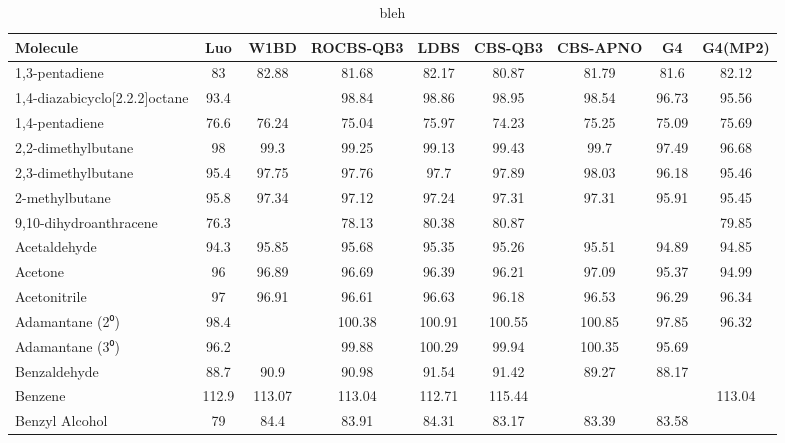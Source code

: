 \begin{center}
\begin{longtable}{l | c c c c c c c c}
\caption{bleh} \label{tab:bde-calc} \\
 Molecule                       &   Luo &   W1BD & ROCBS-QB3 &   LDBS & CBS-QB3 & CBS-APNO &     G4 & G4(MP2) \\
\hline
 1,3-pentadiene                 &    83 &  82.88 &     81.68 &  82.17 &   80.87 &    81.79 &   81.6 &   82.12 \\
 1,4-diazabicyclo[2.2.2]octane  &  93.4 &        &     98.84 &  98.86 &   98.95 &    98.54 &  96.73 &   95.56 \\
 1,4-pentadiene                 &  76.6 &  76.24 &     75.04 &  75.97 &   74.23 &    75.25 &  75.09 &   75.69 \\
 2,2-dimethylbutane             &    98 &   99.3 &     99.25 &  99.13 &   99.43 &     99.7 &  97.49 &   96.68 \\
 2,3-dimethylbutane             &  95.4 &  97.75 &     97.76 &   97.7 &   97.89 &    98.03 &  96.18 &   95.46 \\
 2-methylbutane                 &  95.8 &  97.34 &     97.12 &  97.24 &   97.31 &    97.31 &  95.91 &   95.45 \\
 9,10-dihydroanthracene         &  76.3 &        &     78.13 &  80.38 &   80.87 &          &        &   79.85 \\
 Acetaldehyde                   &  94.3 &  95.85 &     95.68 &  95.35 &   95.26 &    95.51 &  94.89 &   94.85 \\
 Acetone                        &    96 &  96.89 &     96.69 &  96.39 &   96.21 &    97.09 &  95.37 &   94.99 \\
 Acetonitrile                   &    97 &  96.91 &     96.61 &  96.63 &   96.18 &    96.53 &  96.29 &   96.34 \\
 Adamantane (2⁰)                &  98.4 &        &    100.38 & 100.91 &  100.55 &   100.85 &  97.85 &   96.32 \\
 Adamantane (3⁰)                &  96.2 &        &     99.88 & 100.29 &   99.94 &   100.35 &  95.69 &         \\
 Benzaldehyde                   &  88.7 &   90.9 &     90.98 &  91.54 &   91.42 &    89.27 &  88.17 &         \\
 Benzene                        & 112.9 & 113.07 &    113.04 & 112.71 &  115.44 &          &        &  113.04 \\
 Benzyl Alcohol                 &    79 &   84.4 &     83.91 &  84.31 &   83.17 &    83.39 &  83.58 &         \\

\end{longtable}
\end{center}
